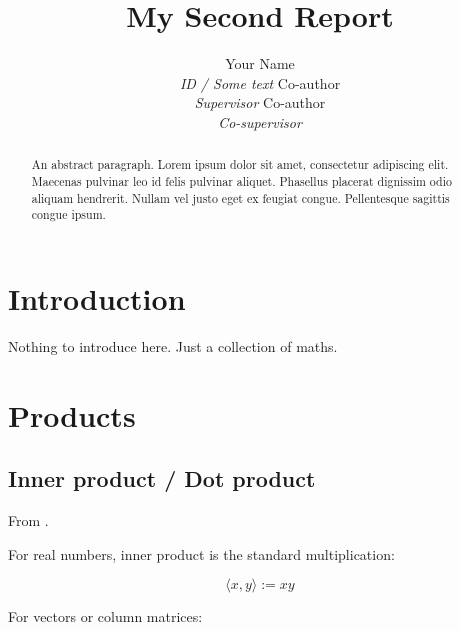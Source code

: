 \documentclass{article}
\title{My Second Report}
\author{Your Name \\ \textit{ID / Some text}  \AND
        Co-author \\ \textit{Supervisor}      \AND
        Co-author \\ \textit{Co-supervisor}}
\begin{document}
\maketitle


\begin{abstract}
    An abstract paragraph. Lorem ipsum dolor sit amet, consectetur adipiscing elit. Maecenas pulvinar leo id felis pulvinar aliquet. Phasellus placerat dignissim odio aliquam hendrerit. Nullam vel justo eget ex feugiat congue. Pellentesque sagittis congue ipsum.
\end{abstract}




\section{Introduction}
\label{sec: Introduction}

Nothing to introduce here. Just a collection of maths.





\section{Products}
\label{sec: Products}

\subsection{Inner product / Dot product}
\label{subsec: Inner product}

From \cite{wiki2019innerProd,wiki2019dotProd,wiki2019cosineSim}.

For real numbers, inner product is the standard multiplication:

\begin{equation}
    \langle x, y\rangle := x y
\end{equation}

For vectors or column matrices:
\end{document}
